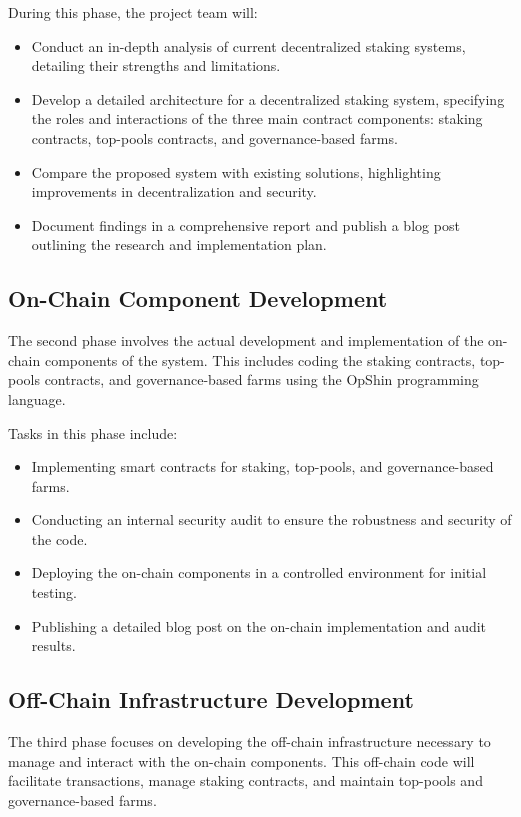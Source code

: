 \documentclass[12pt,parskip=full, tikz]{article}
\begin{document}
During this phase, the project team will:
\begin{itemize}
    \item Conduct an in-depth analysis of current decentralized staking systems, detailing their strengths and limitations.
    \item Develop a detailed architecture for a decentralized staking system, specifying the roles and interactions of the three main contract components: staking contracts, top-pools contracts, and governance-based farms.
    \item Compare the proposed system with existing solutions, highlighting improvements in decentralization and security.
    \item Document findings in a comprehensive report and publish a blog post outlining the research and implementation plan.
\end{itemize}

\subsection{On-Chain Component Development}
The second phase involves the actual development and implementation of the on-chain components of the system. This includes coding the staking contracts, top-pools contracts, and governance-based farms using the OpShin programming language.

Tasks in this phase include:
\begin{itemize}
    \item Implementing smart contracts for staking, top-pools, and governance-based farms.
    \item Conducting an internal security audit to ensure the robustness and security of the code.
    \item Deploying the on-chain components in a controlled environment for initial testing.
    \item Publishing a detailed blog post on the on-chain implementation and audit results.
\end{itemize}

\subsection{Off-Chain Infrastructure Development}
The third phase focuses on developing the off-chain infrastructure necessary to manage and interact with the on-chain components. This off-chain code will facilitate transactions, manage staking contracts, and maintain top-pools and governance-based farms.
\end{document}

